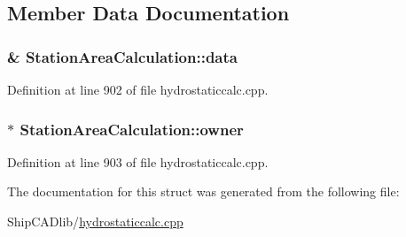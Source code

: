 \subsection{Member Data Documentation}
\hypertarget{structStationAreaCalculation_ad1b380c3cc7135b5d659c7efb5a961c2}{
\subsubsection[{data}]{\& Station\-Area\-Calculation\-::data}}\label{structStationAreaCalculation_ad1b380c3cc7135b5d659c7efb5a961c2}


Definition at line 902 of file hydrostaticcalc.\-cpp.

\hypertarget{structStationAreaCalculation_a84d2ad6a33b1d6e2db182bebf0a5d7af}{
\subsubsection[{owner}]{$\ast$ Station\-Area\-Calculation\-::owner}}\label{structStationAreaCalculation_a84d2ad6a33b1d6e2db182bebf0a5d7af}


Definition at line 903 of file hydrostaticcalc.\-cpp.



The documentation for this struct was generated from the following file\-:\begin{DoxyCompactItemize}
\item 
Ship\-C\-A\-Dlib/\hyperlink{hydrostaticcalc_8cpp}{hydrostaticcalc.\-cpp}\end{DoxyCompactItemize}
